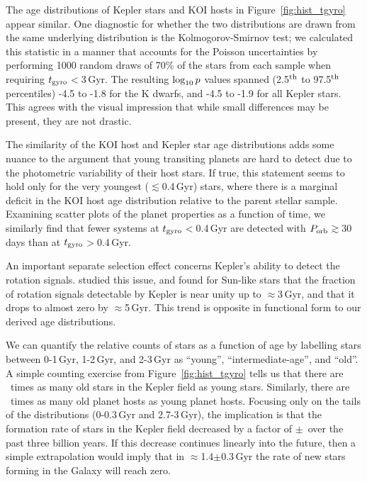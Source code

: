 \documentclass[11pt,twocolumn,tighten,linenumbers]{aastex63}
\begin{document}
The age distributions of Kepler stars and KOI hosts in
Figure~\ref{fig:hist_tgyro} appear similar.  One diagnostic for
whether the two distributions are drawn from the same underlying
distribution is the Kolmogorov-Smirnov test;  we calculated this
statistic in a manner that accounts for the Poisson uncertainties by
performing 1000 random draws of 70\% of the stars from each sample
when requiring $t_{\rm gyro}$$<$3\,Gyr.  The resulting $\log_{\rm
10}p$ values spanned (2.5$^{\rm th}$ to 97.5$^{\rm th}$ percentiles)
-4.5 to -1.8 for the K dwarfs, and -4.5 to -1.9 for all Kepler stars.
This agrees with the visual impression that while small differences
may be present, they are not drastic.

The similarity of the KOI host and Kepler star age distributions adds
some nuance to the argument that young transiting planets are hard to
detect due to the photometric variability of their host stars.  If
true, this statement seems to hold only for the very youngest
($\lesssim$0.4\,Gyr) stars, where there is a marginal deficit in the
KOI host age distribution relative to the parent stellar sample.
Examining scatter plots of the planet properties as a function of
time, we similarly find that fewer systems at $t_{\rm
gyro}$$<$0.4\,Gyr are detected with $P_{\rm orb}$$\gtrsim$30\,days
than at $t_{\rm gyro}$$>$0.4\,Gyr.

An important separate selection effect concerns Kepler's ability to
detect the rotation signals.  \citet{2022ApJ...937...94M} studied this
issue, and found for Sun-like stars that the fraction of rotation
signals detectable by Kepler is near unity up to $\approx$3\,Gyr, and
that it drops to almost zero by $\approx$5\,Gyr.  This trend is
opposite in functional form to our derived age distributions.

We can quantify the relative counts of stars as a function of age by
labelling stars between 0-1\,Gyr, 1-2\,Gyr, and 2-3\,Gyr as ``young'',
``intermediate-age'', and ``old''.  A simple counting exercise from
Figure~\ref{fig:hist_tgyro} tells us that there are
\ratioobtoybstars\ times as many old stars in the Kepler field as young stars.
Similarly, there are \ratioobtoybplanets\ times as many old planet
hosts as young planet hosts.  Focusing only on the tails of the
distributions (0-0.3\,Gyr and 2.7-3\,Gyr), the implication is that the
formation rate of stars in the Kepler field decreased by a factor of
\ratiosfr$\pm$\uncratiosfr\ over the past three billion years.  If
this decrease continues linearly into the future, then a simple
extrapolation would imply that in $\approx$1.4$\pm$0.3\,Gyr the rate
of new stars forming in the Galaxy will reach zero.
\end{document}
